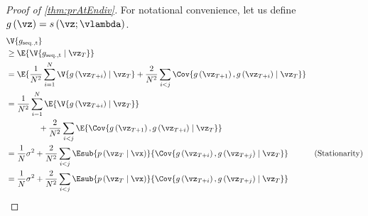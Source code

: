 \prAtEndRestateiv*
\label{proofsection:prAtEndiv}\begin{proof}[Proof of \autoref{thm:prAtEndiv}]\label{proof:prAtEndiv}For notational convenience, let us define \(g\left (\vz \right ) = s\left (\vz ; \vlambda \right )\). \begin {align} &\V {g_{\mathrm {seq., t}}} \\ &\geq \E { \V {g_{\mathrm {seq., t}} \mid \vz _{T}} } \\ &= \E { \frac {1}{N^2} \sum ^{N}_{i=1} \V { g\left (\vz _{T+i}\right ) \mid \vz _{T} } + \frac {2}{N^2} \sum _{i<j} \Cov {g\left (\vz _{T+1}\right ), g\left (\vz _{T+i}\right ) \mid \vz _{T} } } \\ &= \frac {1}{N^2} \sum ^{N}_{i=1} \E { \V { g\left (\vz _{T+i}\right ) \mid \vz _{T} } }\\ &\qquad \qquad + \frac {2}{N^2} \sum _{i<j} \E { \Cov {g\left (\vz _{T+1}\right ), g\left (\vz _{T+i}\right ) \mid \vz _{T} } } \\ &= \frac {1}{N} \sigma ^2 + \frac {2}{N^2} \sum _{i < j} \Esub {p\left (\vz _T\mid \vx \right )}{ \Cov { g\left (\vz _{T+i}\right ), g\left (\vz _{T+j}\right ) \mid \vz _T} } &\text {(Stationarity)} \\ &= \frac {1}{N} \sigma ^2 + \frac {2}{N^2} \sum _{i < j} \Esub {p\left (\vz _T\mid \vx \right )}{ \Cov { g\left (\vz _{T+i}\right ), g\left (\vz _{T+j}\right ) \mid \vz _T} } \end {align}\end{proof}
\prAtEndRestatev*
